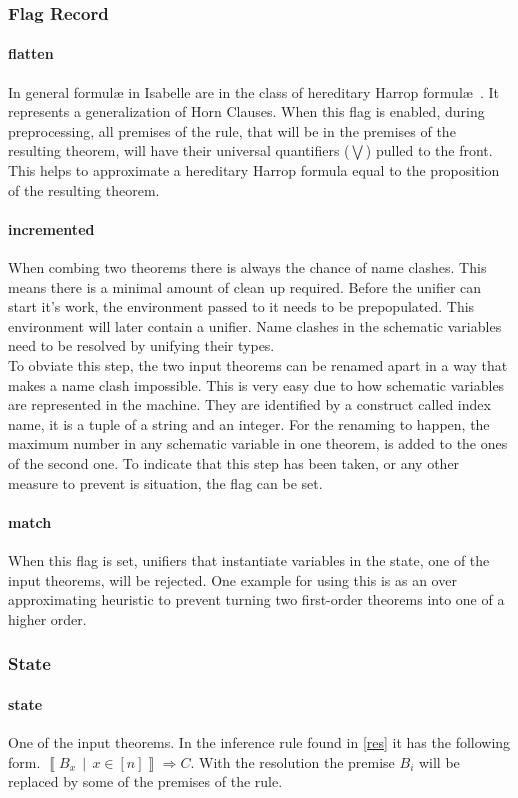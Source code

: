 \subsubsection{Flag Record}
\paragraph{flatten}
In general formul\ae {} in Isabelle are in the class of hereditary Harrop formul\ae~\parencite{implementation}. It represents a generalization of Horn Clauses. When this flag is enabled, during preprocessing, all premises of the rule, that will be in the premises of the resulting theorem, will have their universal quantifiers ($\bigvee$) pulled to the front. This helps to approximate a hereditary Harrop formula equal to the proposition of the resulting theorem.
\paragraph{incremented}
When combing two theorems there is always the chance of name clashes. This means there is a minimal amount of clean up required. Before the unifier can start it's work, the environment passed to it needs to be prepopulated. This environment will later contain a unifier. Name clashes in the schematic variables need to be resolved by unifying their types.\\
To obviate this step, the two input theorems can be renamed apart in a way that makes a name clash impossible. This is very easy due to how schematic variables are represented in the machine. They are identified by a construct called index name, it is a tuple of a string and an integer. For the renaming to happen, the maximum number in any schematic variable in one theorem, is added to the ones of the second one. To indicate that this step has been taken, or any other measure to prevent is situation, the flag can be set.
\paragraph{match}
When this flag is set, unifiers that instantiate variables in the state, one of the input theorems, will be rejected. One example for using this is as an over approximating heuristic to prevent turning two first-order theorems into one of a higher order.

\subsubsection{State}
\paragraph{state}
One of the input theorems. In the inference rule found in \ref{res} it has the following form. $\left\llbracket B_x\,\middle|\, x \in \left[ n \right] \right\rrbracket \Longrightarrow C$. With the resolution the premise $B_i$ will be replaced by some of the premises of the rule.
